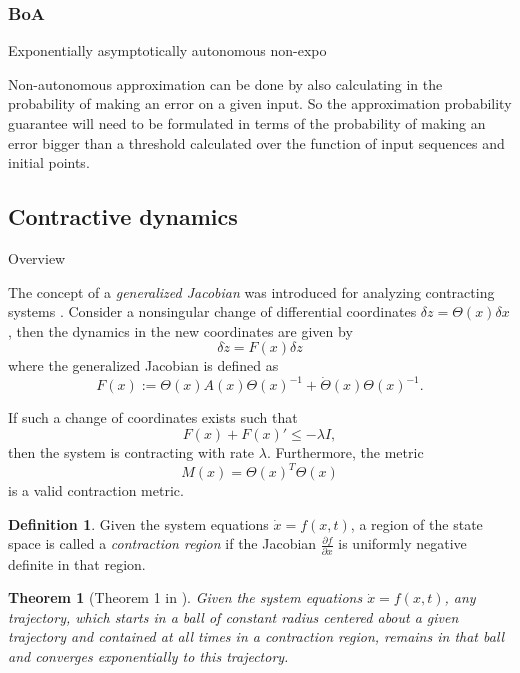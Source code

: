 \documentclass{article}
\newtheorem{theorem}{Theorem}
\theoremstyle{definition} \newtheorem{definition}{Definition}
\theoremstyle{remark} \newtheorem{remark}{Remark}
\newcounter{ct}
\begin{document}
\subsubsection{BoA}
Exponentially asymptotically autonomous \citep{giesl2011numerical}
non-expo \citep{giesl2012numerical}

Non-autonomous approximation can be done by also calculating in the probability of making an error on a given input.
So the approximation probability guarantee will need to be formulated in terms of the probability of making an error bigger than a threshold calculated over the function of input sequences and initial points.




\subsection{Contractive dynamics}\label{sec:contractive}

Overview \citep{aminzare2014contraction, tsukamoto2021contraction}

The concept of a \textit{generalized Jacobian} was introduced for analyzing contracting systems \citep{lohmiller1998contraction}.
Consider a nonsingular change of differential coordinates \( \delta z = \Theta(x) \delta x \), then the dynamics in the new coordinates are given by
\[
\delta\dot{ z} = F(x) \delta z
\]
where the generalized Jacobian is defined as
\[
F(x) := \Theta(x) A(x) \Theta(x)^{-1} + \dot{\Theta}(x) \Theta(x)^{-1}.
\]

If such a change of coordinates exists such that
\[
F(x) + F(x)' \leq -\lambda I,
\]
then the system is contracting with rate \( \lambda \). Furthermore, the metric
\[
M(x) = \Theta(x)^T \Theta(x)
\]
is a valid contraction metric.

\begin{definition}
Given the system equations \(\dot{x} = f(x, t)\), a region of the state space is called a \textit{contraction region} if the Jacobian \(\frac{\partial f}{\partial x}\) is uniformly negative definite in that region.
\end{definition}

\begin{theorem}[Theorem 1 in \citep{lohmiller1998contraction}]\label{thrm:contractive_ball}
Given the system equations  $\dot x = f(x, t)$, any trajectory, which starts in a ball of constant radius centered about a given trajectory and contained at all times in a contraction region, remains in that ball and converges exponentially to this trajectory.
\end{theorem}
\end{document}

